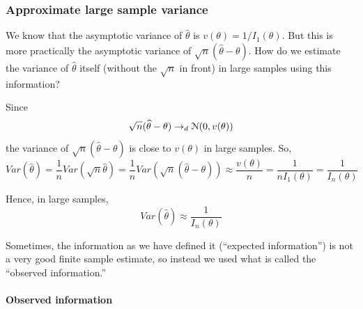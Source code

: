 \documentclass[11pt,]{article}
\let\oldparagraph\paragraph
\renewcommand{\paragraph}[1]{\oldparagraph{#1}\mbox{}}
\def\thetahat{{\widehat\theta}}
\def\Nsc{{\cal N}}
\begin{document}
\hypertarget{approximate-large-sample-variance}{%
\subsubsection{Approximate large sample
variance}\label{approximate-large-sample-variance}}

We know that the asymptotic variance of \(\thetahat\) is
\(v(\theta) = 1/I_1(\theta)\). But this is more practically the
asymptotic variance of \(\sqrt{n}(\thetahat - \theta).\) How do we
estimate the variance of \(\thetahat\) itself (without the \(\sqrt{n}\)
in front) in large samples using this information?

Since \[\sqrt{n}(\thetahat - \theta) \to_d \Nsc(0,v(\theta))\] the
variance of \(\sqrt{n}(\thetahat - \theta)\) is close to \(v(\theta)\)
in large samples. So,
\[Var(\thetahat) = \frac{1}{n} Var(\sqrt{n} \thetahat) = 
\frac{1}{n} Var(\sqrt{n}(\thetahat - \theta)) \approx \frac{v(\theta)}{n} = 
\frac{1}{nI_1(\theta)} = \frac{1}{I_n(\theta)}\]

Hence, in large samples,
\[Var(\thetahat) \approx \frac{1}{I_n(\theta)}\]

Sometimes, the information as we have defined it (``expected
information'') is not a very good finite sample estimate, so instead we
used what is called the ``observed information.''

\hypertarget{observed-information}{%
\paragraph{Observed information}\label{observed-information}}
\end{document}
